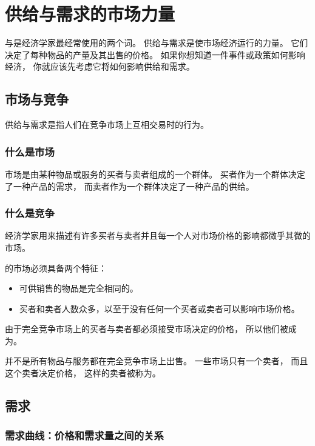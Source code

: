 
\chapter{供给与需求的市场力量}

与是经济学家最经常使用的两个词。
供给与需求是使市场经济运行的力量。
它们决定了每种物品的产量及其出售的价格。
如果你想知道一件事件或政策如何影响经济，
你就应该先考虑它将如何影响供给和需求。


\section{市场与竞争}

供给与需求是指人们在竞争市场上互相交易时的行为。

\subsection{什么是市场}

市场是由某种物品或服务的买者与卖者组成的一个群体。
买者作为一个群体决定了一种产品的需求，
而卖者作为一个群体决定了一种产品的供给。


\subsection{什么是竞争}

经济学家用来描述有许多买者与卖者并且每一个人对市场价格的影响都微乎其微的市场。


的市场必须具备两个特征：
\begin{itemize}
\item 可供销售的物品是完全相同的。
\item 买者和卖者人数众多，以至于没有任何一个买者或卖者可以影响市场价格。
\end{itemize}
由于完全竞争市场上的买者与卖者都必须接受市场决定的价格，
所以他们被成为。


并不是所有物品与服务都在完全竞争市场上出售。
一些市场只有一个卖者，
而且这个卖者决定价格，
这样的卖者被称为。


\section{需求}

\subsection{需求曲线：价格和需求量之间的关系}


